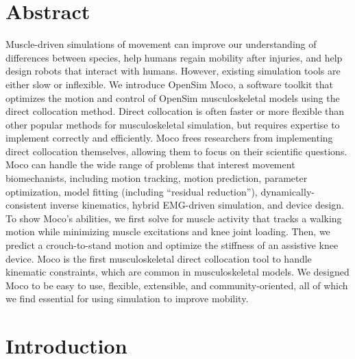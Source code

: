 \documentclass[10pt,letterpaper]{article}
\begin{document}
\section*{Abstract}
Muscle-driven simulations of movement can improve our understanding of differences between species, help humans regain mobility after injuries, and help design robots that interact with humans. However, existing simulation tools are either slow or inflexible.
We introduce OpenSim Moco, a software toolkit that optimizes the motion and control of OpenSim musculoskeletal models using the direct collocation method.
Direct collocation is often faster or more flexible than other popular methods for musculoskeletal simulation, but requires expertise to implement correctly and efficiently. Moco frees researchers from implementing direct collocation themselves, allowing them to focus on their scientific questions.
Moco can handle the wide range of problems that interest movement biomechanists, including motion tracking, motion prediction, parameter optimization, model fitting (including “residual reduction”), dynamically-consistent inverse kinematics, hybrid EMG-driven simulation, and device design.
To show Moco’s abilities, we first solve for muscle activity that tracks a walking motion while minimizing muscle excitations and knee joint loading. Then, we predict a crouch-to-stand motion and optimize the stiffness of an assistive knee device.
Moco is the first musculoskeletal direct collocation tool to handle kinematic constraints, which are common in musculoskeletal models.
We designed Moco to be easy to use, flexible, extensible, and community-oriented, all of which we find essential for using simulation to improve mobility.



\linenumbers

\section*{Introduction}
\end{document}
